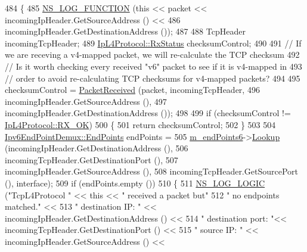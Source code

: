 \begin{DoxyCode}
484 \{
485   \hyperlink{log-macros-disabled_8h_a90b90d5bad1f39cb1b64923ea94c0761}{NS\_LOG\_FUNCTION} (\textcolor{keyword}{this} << packet << incomingIpHeader.GetSourceAddress () <<
486                    incomingIpHeader.GetDestinationAddress ());
487 
488   TcpHeader incomingTcpHeader;
489   \hyperlink{classns3_1_1IpL4Protocol_afd3744c89902fff232e2fd45f558c80e}{IpL4Protocol::RxStatus} checksumControl;
490 
491   \textcolor{comment}{// If we are receving a v4-mapped packet, we will re-calculate the TCP checksum}
492   \textcolor{comment}{// Is it worth checking every received "v6" packet to see if it is v4-mapped in}
493   \textcolor{comment}{// order to avoid re-calculating TCP checksums for v4-mapped packets?}
494 
495   checksumControl = \hyperlink{classns3_1_1TcpL4Protocol_a3ff49ecbf02516282f7b8158819f432b}{PacketReceived} (packet, incomingTcpHeader,
496                                     incomingIpHeader.GetSourceAddress (),
497                                     incomingIpHeader.GetDestinationAddress ());
498 
499   \textcolor{keywordflow}{if} (checksumControl != \hyperlink{classns3_1_1IpL4Protocol_afd3744c89902fff232e2fd45f558c80eabd979bce2f3b22521c81c4115c66317e}{IpL4Protocol::RX\_OK})
500     \{
501       \textcolor{keywordflow}{return} checksumControl;
502     \}
503 
504   \hyperlink{classns3_1_1Ipv6EndPointDemux_a40c1d59189759e1e7f5cabe7cd01c0fa}{Ipv6EndPointDemux::EndPoints} endPoints =
505     \hyperlink{classns3_1_1TcpL4Protocol_a88deacf73247133fccfe64179ad665e3}{m\_endPoints6}->\hyperlink{classns3_1_1Ipv6EndPointDemux_a14fd788471bcde832d3f125bdfabc24b}{Lookup} (incomingIpHeader.GetDestinationAddress (),
506                           incomingTcpHeader.GetDestinationPort (),
507                           incomingIpHeader.GetSourceAddress (),
508                           incomingTcpHeader.GetSourcePort (), interface);
509   \textcolor{keywordflow}{if} (endPoints.empty ())
510     \{
511       \hyperlink{group__logging_ga88acd260151caf2db9c0fc84997f45ce}{NS\_LOG\_LOGIC} (\textcolor{stringliteral}{"TcpL4Protocol "} << \textcolor{keyword}{this} << \textcolor{stringliteral}{" received a packet but"}
512                     \textcolor{stringliteral}{" no endpoints matched."} <<
513                     \textcolor{stringliteral}{" destination IP: "} << incomingIpHeader.GetDestinationAddress () <<
514                     \textcolor{stringliteral}{" destination port: "}<< incomingTcpHeader.GetDestinationPort () <<
515                     \textcolor{stringliteral}{" source IP: "} << incomingIpHeader.GetSourceAddress () <<

\end{DoxyCode}
